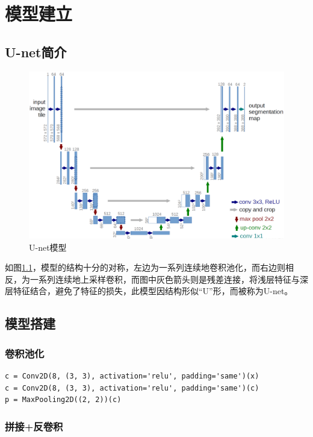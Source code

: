 \chapter{模型建立}

\section{U-net简介}

\begin{figure}[htbp]
\centering
\includegraphics[width=0.8\linewidth]{body/model_pic/unet}
\caption{U-net模型}
\label{fig::model15}
\end{figure}

如图\ref{fig::model15}，模型的结构十分的对称，左边为一系列连续地卷积池化，而右边则相反，为一系列连续地上采样卷积，而图中灰色箭头则是残差连接，将浅层特征与深层特征结合，避免了特征的损失，此模型因结构形似``U''形，而被称为U-net。

\section{模型搭建}

\subsection{卷积池化}

\begin{lstlisting}
c = Conv2D(8, (3, 3), activation='relu', padding='same')(x)
c = Conv2D(8, (3, 3), activation='relu', padding='same')(c)
p = MaxPooling2D((2, 2))(c)
\end{lstlisting}

\subsection{拼接+反卷积}


